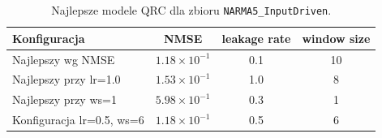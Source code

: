 \begin{table}[ht]
\centering
\caption{Najlepsze modele QRC dla zbioru \texttt{NARMA5\_InputDriven}.}
\label{tab:qrc-narma5_inputdriven}
\begin{tabular}{lccc}
\toprule
Konfiguracja & NMSE & leakage rate & window size \\
\midrule
Najlepszy wg NMSE & $1.18 \times 10^{-1}$ & 0.1 & 10 \\
Najlepszy przy lr=1.0 & $1.53 \times 10^{-1}$ & 1.0 & 8 \\
Najlepszy przy ws=1 & $5.98 \times 10^{-1}$ & 0.3 & 1 \\
Konfiguracja lr=0.5, ws=6 & $1.18 \times 10^{-1}$ & 0.5 & 6 \\
\bottomrule
\end{tabular}
\end{table}